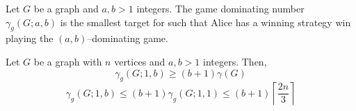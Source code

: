 \begin{definition}
    Let $G$ be a graph and $a,b>1$ integers. The game dominating number $\gamma_g(G;a,b)$ is the smallest target for such that Alice has a winning strategy win playing the $(a,b)$--dominating game.
\end{definition}

\begin{theorem} %
    Let $G$ be a graph with $n$ vertices and $a,b>1$ integers. Then,
    \[\gamma_{g}(G;1,b) \geq (b+1)\gamma(G) \]    
    \[\gamma_{g}(G;1,b) \leq (b+1) \gamma_{g}(G;1,1) \leq (b+1)\left\lceil \frac{2n}{3} \right\rceil\]
\end{theorem}













